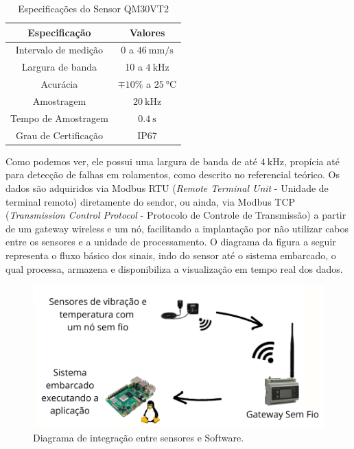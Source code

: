 \begin{table}[H]
    \caption{Especificações do Sensor QM30VT2}
    \label{tab:espec_sensor}
    \centering%
    \begin{minipage}{.45\textwidth}
      \begin{tabular*}{\textwidth}{c|c}
        \hline
        Especificação            & Valores                                     \\ \hline
        \hline
        Intervalo de medição     &  0 a $\SI{46}{\milli\metre\per\second}$     \\
        Largura de banda         &  10 a $\SI{4}{\kilo\hertz}$                 \\ 
        Acurácia                 &  $\mp 10 \%$ a $\SI{25}{\celsius}$          \\
        Amostragem               &  $\SI{20}{\kilo\hertz}$                     \\
        Tempo de Amostragem      &  $\SI{0.4}{\second}$                        \\
        Grau de Certificação     &  IP67                                       \\ \hline
      \end{tabular*}
    \end{minipage}
  \end{table}

Como podemos ver, ele possui uma largura de banda de até $\SI{4}{\kilo\hertz}$, propícia até para detecção de falhas em rolamentos, como 
descrito no referencial teórico. Os dados são adquiridos via Modbus RTU (\textit{Remote Terminal Unit} - Unidade de terminal remoto) diretamente
do sendor, ou ainda, via Modbus TCP (\textit{Transmission Control Protocol} - Protocolo de Controle de Transmissão) a partir de um gateway
wireless e um nó, facilitando a implantação por não utilizar cabos entre os sensores e a unidade de processamento. O diagrama da figura a seguir
representa o fluxo básico dos sinais, indo do sensor até o sistema embarcado, o qual processa, armazena e disponibiliza a visualização em 
tempo real dos dados. 

\begin{figure}[H]
    \caption{Diagrama de integração  entre sensores e Software.}
    \begin{center}
        \includegraphics[scale=0.8, page=1]{metodologia/img/fluxo_layout.pdf}
    \end{center}
    \label{fig:fluxo_integracao}
\end{figure}


